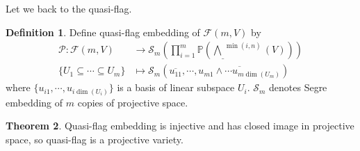 \documentclass[10pt,UTF8]{article}
\theoremstyle{definition}
\newtheorem{definition}{Definition}[section]
\newtheorem{theorem}[definition]{Theorem}
\begin{document}
Let we back to the quasi-flag.

\begin{definition}
  Define quasi-flag embedding of $\mathcal{F}(m,V)$ by
  \begin{align*}
    \mathscr{P}: \mathcal{F}(m,V)  &\to \mathscr{S}_m \left(\prod_{i=1}^{m} \mathbb{P} \left(
    \underline{\bigwedge}^{\min(i,n)}(V) \right)\right)   \\
    \{U_1\subseteq \cdots \subseteq U_m\}  &\mapsto \mathscr{S}_m(\overline{u_{11}},\cdots,\overline{u_{m1}\wedge \cdots u_{m\dim(U_m)}} )
   \end{align*}
  where $\{u_{i1},\cdots,u_{i\dim(U_i)}\}$ is a basis of linear subspace $U_i$.
  $\mathscr{S}_m$ denotes Segre embedding of $m$ copies of projective space.
\end{definition}

\begin{theorem}
  Quasi-flag embedding is injective and has closed image in projective space, so quasi-flag is a projective variety. \label{qfp}
\end{theorem}
\end{document}
